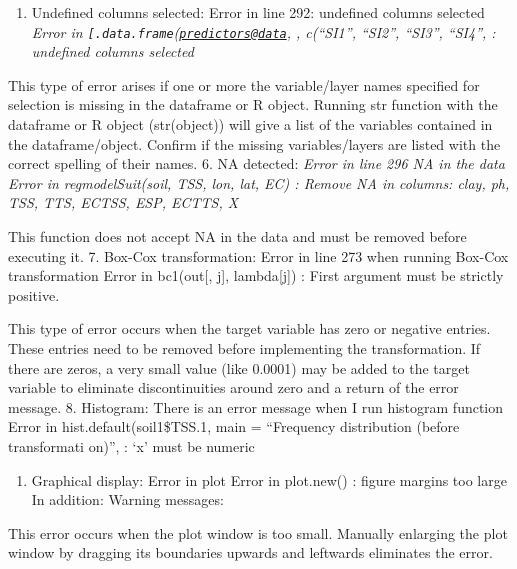 \documentclass[
  10pt,
  b5paper,
]{book}
\providecommand{\tightlist}{%
  \setlength{\itemsep}{0pt}\setlength{\parskip}{0pt}}
\begin{document}
\begin{enumerate}
\def\labelenumi{\arabic{enumi}.}
\setcounter{enumi}{4}
\tightlist
\item
  Undefined columns selected: Error in line 292: undefined columns selected
  \emph{Error in \texttt{{[}.data.frame}(\href{mailto:predictors@data}{\nolinkurl{predictors@data}}, , c(``SI1'', ``SI2'', ``SI3'', ``SI4'', : undefined columns selected}
\end{enumerate}

This type of error arises if one or more the variable/layer names specified for selection is missing in the dataframe or R object. Running str function with the dataframe or R object (str(object)) will give a list of the variables contained in the dataframe/object. Confirm if the missing variables/layers are listed with the correct spelling of their names.
6. NA detected: \emph{Error in line 296 NA in the data
Error in regmodelSuit(soil, TSS, lon, lat, EC) :
Remove NA in columns: clay, ph, TSS, TTS, ECTSS, ESP, ECTTS, X}

This function does not accept NA in the data and must be removed before executing it.
7. Box-Cox transformation: Error in line 273 when running Box-Cox transformation
Error in bc1(out{[}, j{]}, lambda{[}j{]}) :
First argument must be strictly positive.

This type of error occurs when the target variable has zero or negative entries. These entries need to be removed before implementing the transformation. If there are zeros, a very small value (like 0.0001) may be added to the target variable to eliminate discontinuities around zero and a return of the error message.
8. Histogram: There is an error message when I run histogram function
Error in hist.default(soil1\$TSS.1, main = ``Frequency distribution (before transformati on)'', :
`x' must be numeric

\begin{enumerate}
\def\labelenumi{\arabic{enumi}.}
\setcounter{enumi}{8}
\tightlist
\item
  Graphical display: Error in plot
  Error in plot.new() : figure margins too large In addition: Warning messages:
\end{enumerate}

This error occurs when the plot window is too small. Manually enlarging the plot window by dragging its boundaries upwards and leftwards eliminates the error.
\end{document}

